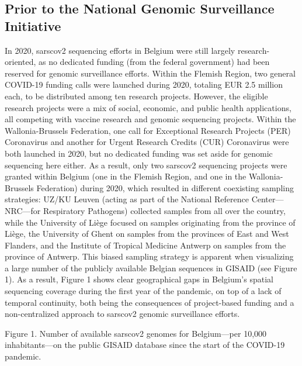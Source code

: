 \subsection{Prior to the National Genomic Surveillance Initiative}
In 2020, \gls{sarscov2} sequencing efforts in Belgium were still largely research-oriented, as no dedicated funding (from the federal government) had been reserved for genomic surveillance efforts.
Within the Flemish Region, two general COVID-19 funding calls were launched during 2020, totaling EUR 2.5 million each, to be distributed among ten research projects.
However, the eligible research projects were a mix of social, economic, and public health applications, all competing with vaccine research and genomic sequencing projects.
Within the Wallonia-Brussels Federation, one call for Exceptional Research Projects (PER) Coronavirus and another for Urgent Research Credits (CUR) Coronavirus were both launched in 2020, but no dedicated funding was set aside for genomic sequencing here either.
As a result, only two \gls{sarscov2} sequencing projects were granted within Belgium (one in the Flemish Region, and one in the Wallonia-Brussels Federation) during 2020, which resulted in different coexisting sampling strategies: UZ/KU Leuven (acting as part of the National Reference Center—NRC—for Respiratory Pathogens) collected samples from all over the country, while the University of Li\`{e}ge focused on samples originating from the province of Li\`{e}ge, the University of Ghent on samples from the provinces of East and West Flanders, and the Institute of Tropical Medicine Antwerp on samples from the province of Antwerp.
This biased sampling strategy is apparent when visualizing a large number of the publicly available Belgian sequences in GISAID (see Figure 1).
As a result, Figure 1 shows clear geographical gaps in Belgium's spatial sequencing coverage during the first year of the pandemic, on top of a lack of temporal continuity, both being the consequences of project-based funding and a non-centralized approach to \gls{sarscov2} genomic surveillance efforts.


Figure 1. Number of available \gls{sarscov2} genomes for Belgium—per 10,000 inhabitants—on the public GISAID database since the start of the COVID-19 pandemic.


